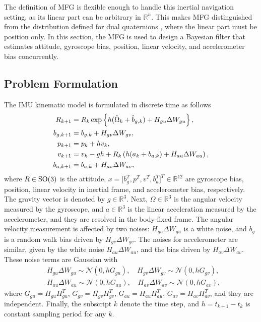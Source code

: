 The definition of MFG is flexible enough to handle this inertial navigation setting, as its linear part can be arbitrary in $\mathbb{R}^n$.
This makes MFG distinguished from the distribution defined for dual quaternions \cite{li2019geometry,li2020unscented}, where the linear part must be position only.
In this section, the MFG is used to design a Bayesian filter that estimates attitude, gyroscope bias, position, linear velocity, and accelerometer bias concurrently.

\subsection{Problem Formulation}

The IMU kinematic model is formulated in discrete time as follows
\begin{align}
	R_{k+1} &= R_k \exp\left\{  h(\hat{\Omega}_k + \hat{b}_{g,k}) + H_{gu}\Delta W_{gu}  \right\}, \label{eqn:posEst-kinematics-attitude} \\
	b_{g,k+1} &= b_{g,k} + H_{gv}\Delta W_{gv}, \label{eqn:posEst-kinematics-gyrobias} \\
	p_{k+1} &= p_k + hv_k, \label{eqn:posEst-kinematics-pos} \\
	v_{k+1} &= v_k - gh + R_k\left( h(a_k+b_{a,k}) + H_{au}\Delta W_{au} \right), \label{eqn:posEst-kinematics-velocity} \\
	b_{a,k+1} &= b_{a,k} + H_{av}\Delta W_{av}, \label{eqn:posEst-kinematics-accebias}
\end{align}
where $R\in\mathrm{SO}(3)$ is the attitude, $x = \big[b_g^T, p^T, v^T, b_a^T\big]^T \in \mathbb{R}^{12}$ are gyroscope bias, position, linear velocity in inertial frame, and accelerometer bias, respectively.
The gravity vector is denoted by $g\in\mathbb{R}^3$.
Next, $\Omega\in\mathbb{R}^3$ is the angular velocity measured by the gyroscope, and $a\in\mathbb{R}^3$ is the linear acceleration measured by the accelerometer, and they are resolved in the body-fixed frame.
The angular velocity measurement is affected by two noises: $H_{gu}\Delta W_{gu}$ is a white noise, and $b_g$ is a random walk bias driven by $H_{gv}\Delta W_{gv}$.
The noises for accelerometer are similar, given by the white noise $H_{au}\Delta W_{au}$, and the bias driven by $H_{av}\Delta W_{av}$.
These noise terms are Gaussian with
\begin{align}
	&H_{gu}\Delta W_{gu} \sim \mathcal{N}(0,hG_{gu}), \quad H_{gv}\Delta W_{gv} \sim \mathcal{N}(0,hG_{gv}), \label{eqn:posEst-gyroNoise} \\
	&H_{au}\Delta W_{au} \sim \mathcal{N}(0,hG_{au}), \quad H_{av}\Delta W_{av} \sim \mathcal{N}(0,hG_{av}),
\end{align}
where $G_{gu} = H_{gu}H_{gu}^T$, $G_{gv} = H_{gv}H_{gv}^T$, $G_{au} = H_{au}H_{au}^T$, $G_{av} = H_{av}H_{av}^T$, and they are independent.
Finally, the subscript $k$ denote the time step, and $h = t_{k+1}-t_k$ is constant sampling period for any $k$.

